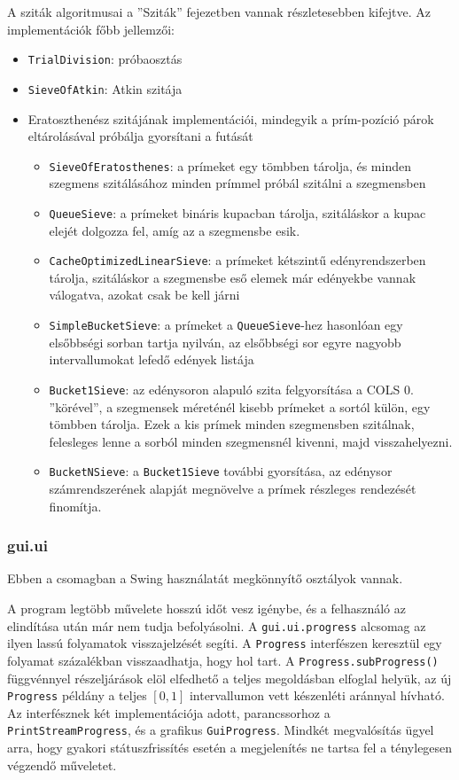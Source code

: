 A sziták algoritmusai a ''Sziták'' fejezetben vannak részletesebben kifejtve.
Az implementációk főbb jellemzői:
\begin{itemize}
\item \texttt{TrialDivision}: próbaosztás
\item \texttt{SieveOfAtkin}: Atkin szitája
\item Eratoszthenész szitájának implementációi, mindegyik a prím-pozíció párok eltárolásával próbálja gyorsítani a futását
\begin{itemize}
\item \texttt{SieveOfEratosthenes}: a prímeket egy tömbben tárolja, és minden szegmens szitálásához minden prímmel próbál szitálni a szegmensben
\item \texttt{QueueSieve}: a prímeket bináris kupacban tárolja, szitáláskor a kupac elejét dolgozza fel, amíg az a szegmensbe esik.
\item \texttt{CacheOptimizedLinearSieve}: a prímeket kétszintű edényrendszerben tárolja, szitáláskor a szegmensbe eső elemek már edényekbe vannak válogatva, azokat csak be kell járni
\item \texttt{SimpleBucketSieve}: a prímeket a \texttt{QueueSieve}-hez hasonlóan egy elsőbbségi sorban tartja nyilván, az elsőbbségi sor egyre nagyobb intervallumokat lefedő edények listája
\item \texttt{Bucket1Sieve}: az edénysoron alapuló szita felgyorsítása a COLS 0. ''körével'', a szegmensek méreténél kisebb prímeket a sortól külön, egy tömbben tárolja. Ezek a kis prímek minden szegmensben szitálnak, felesleges lenne a sorból minden szegmensnél kivenni, majd visszahelyezni.
\item \texttt{BucketNSieve}: a \texttt{Bucket1Sieve} további gyorsítása, az edénysor számrendszerének alapját megnövelve a prímek részleges rendezését finomítja.
\end{itemize}
\end{itemize}

\subsubsection{gui.ui}

Ebben a csomagban a Swing használatát megkönnyítő osztályok vannak.

A program legtöbb művelete hosszú időt vesz igénybe, és a felhasználó az elindítása után már nem tudja befolyásolni.
A \texttt{gui.ui.progress} alcsomag az ilyen lassú folyamatok visszajelzését segíti.
A \texttt{Progress} interfészen keresztül egy folyamat százalékban visszaadhatja, hogy hol tart.
A \texttt{Progress.subProgress()} függvénnyel részeljárások elöl elfedhető a teljes megoldásban elfoglal helyük, az új \texttt{Progress} példány a teljes $[0, 1]$ intervallumon vett készenléti aránnyal hívható.
Az interfésznek két implementációja adott, parancssorhoz a \texttt{PrintStreamProgress}, és a grafikus \texttt{GuiProgress}.
Mindkét megvalósítás ügyel arra, hogy gyakori státuszfrissítés esetén a megjelenítés ne tartsa fel a ténylegesen végzendő műveletet.


